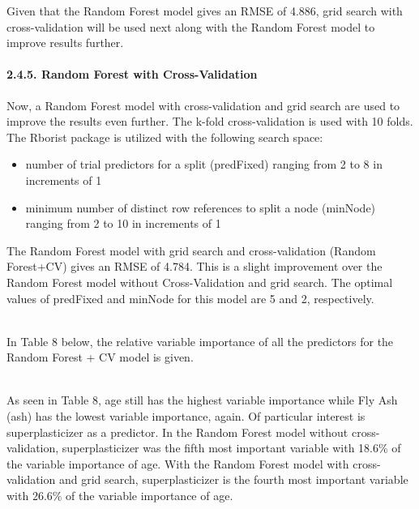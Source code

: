 \documentclass[
]{article}
\providecommand{\tightlist}{%
  \setlength{\itemsep}{0pt}\setlength{\parskip}{0pt}}
\begin{document}
\hfill\break
Given that the Random Forest model gives an RMSE of 4.886, grid search
with cross-validation will be used next along with the Random Forest
model to improve results further.

\hypertarget{random-forest-with-cross-validation}{%
\paragraph{2.4.5. Random Forest with
Cross-Validation}\label{random-forest-with-cross-validation}}

\hfill\break
Now, a Random Forest model with cross-validation and grid search are
used to improve the results even further. The k-fold cross-validation is
used with 10 folds. The Rborist package is utilized with the following
search space:

\begin{itemize}
\tightlist
\item
  number of trial predictors for a split (predFixed) ranging from 2 to 8
  in increments of 1
\item
  minimum number of distinct row references to split a node (minNode)
  ranging from 2 to 10 in increments of 1
\end{itemize}

The Random Forest model with grid search and cross-validation (Random
Forest+CV) gives an RMSE of 4.784. This is a slight improvement over the
Random Forest model without Cross-Validation and grid search. The
optimal values of predFixed and minNode for this model are 5 and 2,
respectively.\\
\strut \\
In Table 8 below, the relative variable importance of all the predictors
for the Random Forest + CV model is given.\\
\strut \\
As seen in Table 8, age still has the highest variable importance while
Fly Ash (ash) has the lowest variable importance, again. Of particular
interest is superplasticizer as a predictor. In the Random Forest model
without cross-validation, superplasticizer was the fifth most important
variable with 18.6\% of the variable importance of age. With the Random
Forest model with cross-validation and grid search, superplasticizer is
the fourth most important variable with 26.6\% of the variable
importance of age.
\end{document}
